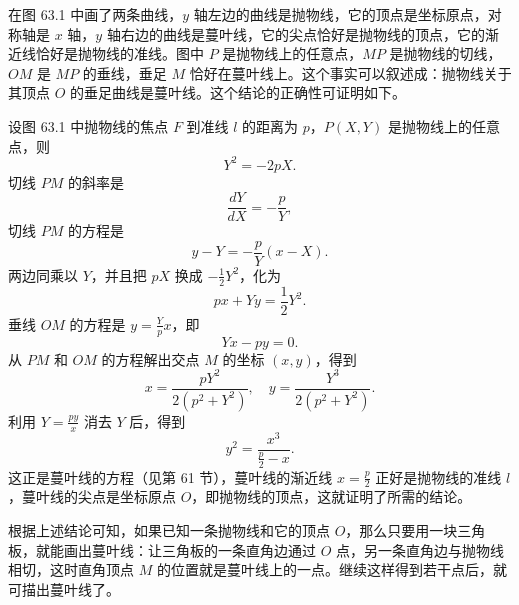 在图 63.1 中画了两条曲线，$y$ 轴左边的曲线是抛物线，它的顶点是坐标原点，对称轴是 $x$ 轴，$y$ 轴右边的曲线是蔓叶线，它的尖点恰好是抛物线的顶点，它的渐近线恰好是抛物线的准线。图中 $P$ 是抛物线上的任意点，$MP$ 是抛物线的切线，$OM$ 是 $MP$ 的垂线，垂足 $M$ 恰好在蔓叶线上。这个事实可以叙述成：抛物线关于其顶点 $O$ 的垂足曲线是蔓叶线。这个结论的正确性可证明如下。

设图 63.1 中抛物线的焦点 $F$ 到准线 $l$ 的距离为 $p$，$P(X,Y)$ 是抛物线上的任意点，则
\[
  Y^2 = -2pX.
\]
切线 $PM$ 的斜率是
\[
  \frac{dY}{dX} = -\frac{p}{Y},
\]
切线 $PM$ 的方程是
\[
  y - Y = -\frac{p}{Y}(x - X).
\]
两边同乘以 $Y$，并且把 $pX$ 换成 $-\frac{1}{2}Y^2$，化为
\[
  px + Yy = \frac{1}{2}Y^2.
\]
垂线 $OM$ 的方程是 $y = \frac{Y}{p}x$，即
\[
  Yx - py = 0.
\]
从 $PM$ 和 $OM$ 的方程解出交点 $M$ 的坐标 $(x,y)$，得到
\[
  x = \frac{pY^2}{2(p^2+Y^2)},\quad y = \frac{Y^3}{2(p^2+Y^2)}.
\]
利用 $Y=\frac{py}{x}$ 消去 $Y$ 后，得到
\[
  y^2 = \frac{x^3}{\frac{p}{2}-x}.
\]
这正是蔓叶线的方程（见第 61 节），蔓叶线的渐近线 $x=\frac{p}{2}$ 正好是抛物线的准线 $l$，蔓叶线的尖点是坐标原点 $O$，即抛物线的顶点，这就证明了所需的结论。

根据上述结论可知，如果已知一条抛物线和它的顶点 $O$，那么只要用一块三角板，就能画出蔓叶线：让三角板的一条直角边通过 $O$ 点，另一条直角边与抛物线相切，这时直角顶点 $M$ 的位置就是蔓叶线上的一点。继续这样得到若干点后，就可描出蔓叶线了。

